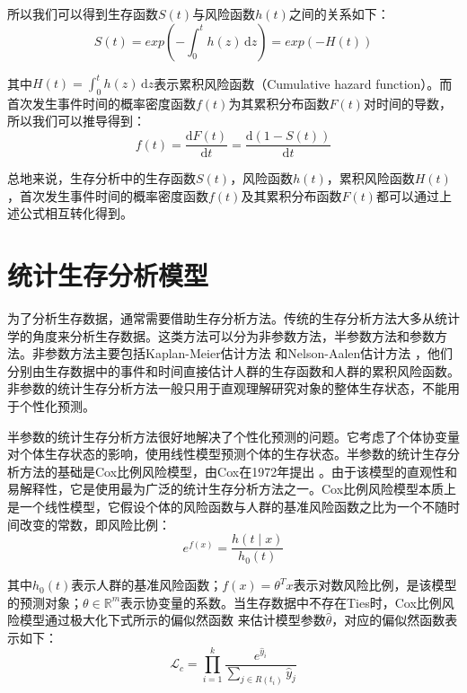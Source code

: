 所以我们可以得到生存函数$S(t)$与风险函数$h(t)$之间的关系如下：
\begin{equation}
S(t)=exp⁡\left(-\int_0^{t} h(z)\,\mathrm{d}z\right)=exp⁡(-H(t)) \label{F2}
\end{equation}

其中$H(t)=\int_0^{t} h(z)\,\mathrm{d}z$表示累积风险函数（Cumulative hazard function）。而首次发生事件时间的概率密度函数$f(t)$为其累积分布函数$F(t)$对时间的导数，所以我们可以推导得到：
\begin{equation}
f(t)=\frac{\mathrm{d}F(t)}{\mathrm{d}t}=\frac{\mathrm{d}(1-S(t))}{\mathrm{d}t} \label{F3}
\end{equation}

总地来说，生存分析中的生存函数$S(t)$，风险函数$h(t)$，累积风险函数$H(t)$，首次发生事件时间的概率密度函数$f(t)$及其累积分布函数$F(t)$都可以通过上述公式相互转化得到。

\section{统计生存分析模型}

为了分析生存数据，通常需要借助生存分析方法。传统的生存分析方法大多从统计学的角度来分析生存数据。这类方法可以分为非参数方法，半参数方法和参数方法。非参数方法主要包括Kaplan-Meier估计方法  和Nelson-Aalen估计方法 ，他们分别由生存数据中的事件和时间直接估计人群的生存函数和人群的累积风险函数。非参数的统计生存分析方法一般只用于直观理解研究对象的整体生存状态，不能用于个性化预测。

半参数的统计生存分析方法很好地解决了个性化预测的问题。它考虑了个体协变量对个体生存状态的影响，使用线性模型预测个体的生存状态。半参数的统计生存分析方法的基础是Cox比例风险模型，由Cox在1972年提出 。由于该模型的直观性和易解释性，它是使用最为广泛的统计生存分析方法之一。Cox比例风险模型本质上是一个线性模型，它假设个体的风险函数与人群的基准风险函数之比为一个不随时间改变的常数，即风险比例：
\begin{equation}
e^{f(x)} =\frac{h(t\mid x)}{h_0 (t)} \label{F4}
\end{equation}

其中$h_0 (t)$表示人群的基准风险函数；$f(x)=\theta^T x$表示对数风险比例，是该模型的预测对象；$\theta \in \mathbb{R}^m$表示协变量的系数。当生存数据中不存在Ties时，Cox比例风险模型通过极大化下式所示的偏似然函数 来估计模型参数$\hat{\theta}$，对应的偏似然函数表示如下：
\begin{equation}
\mathcal{L}_c = \prod_{i=1}^k \frac{e^{\hat{y}_i}}{\sum_{j\in R(t_i)} \hat{y}_j} \label{F5}
\end{equation}

